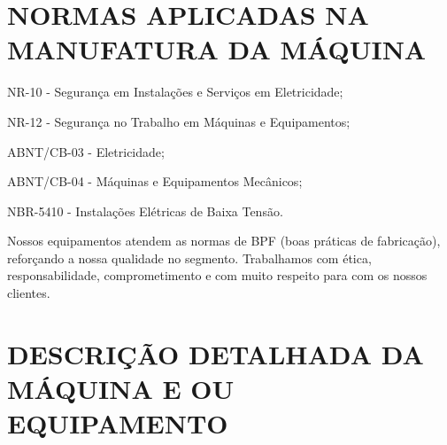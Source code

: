 \thispagestyle{fancy}

\vspace*{40 pt}

\section{\large{NORMAS APLICADAS NA MANUFATURA DA MÁQUINA}}
\label{sec:normas}


\begin{standartsMet}
    \item[\ding{\dingNumber}] NR-10 - Segurança em Instalações e Serviços em Eletricidade;
    \item[\ding{\dingNumber}] NR-12 - Segurança no Trabalho em Máquinas e Equipamentos;
    \item[\ding{\dingNumber}] ABNT/CB-03 - Eletricidade;
    \item[\ding{\dingNumber}] ABNT/CB-04 - Máquinas e Equipamentos Mecânicos;
    \item[\ding{\dingNumber}] NBR-5410 - Instalações Elétricas de Baixa Tensão.
\end{standartsMet}

Nossos equipamentos atendem as normas de BPF (boas práticas de fabricação), reforçando a nossa qualidade no segmento.
Trabalhamos com ética, responsabilidade, comprometimento e com muito respeito para com os nossos clientes.

\section{\large{\MakeUppercase{Descrição Detalhada da Máquina e ou Equipamento}}}
\label{sec:machineDescription}


